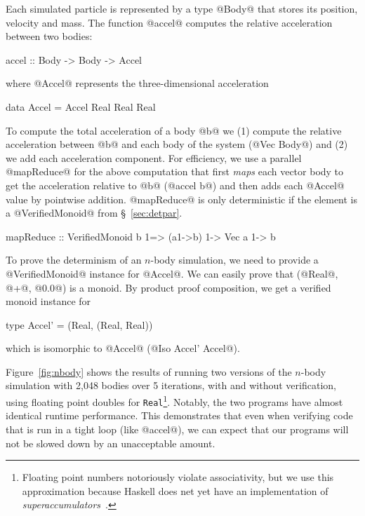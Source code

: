Each simulated particle is represented by a
type @Body@ that stores its position, velocity and mass.
%
The function @accel@ computes the relative acceleration
between two bodies:
\begin{mcode}
  accel :: Body -> Body -> Accel
\end{mcode}
where @Accel@ represents the three-dimensional acceleration
\begin{mcode}
  data Accel = Accel Real Real Real
\end{mcode}
%
To compute the total acceleration
of a body @b@ we
(1) compute the relative acceleration between @b@
and each body of the system (@Vec Body@) and
(2) we add each acceleration component.
%
For efficiency, we use a parallel @mapReduce@ for the above
computation that
first \textit{maps} each vector body to get the acceleration relative to @b@
(@accel b@) and then adds each @Accel@ value by pointwise addition.
%
@mapReduce@ is only deterministic if the element is a @VerifiedMonoid@
from \S~\ref{sec:detpar}.
\begin{mcode}
mapReduce :: VerifiedMonoid b 1=> (a1->b) 1-> Vec a 1-> b
\end{mcode}
%
To prove the determinism of an $n$-body simulation, we need to provide a
@VerifiedMonoid@ instance for @Accel@.
%
We can easily prove that (@Real@, @+@, @0.0@)
is a monoid.
%
By product proof composition, we get a verified monoid instance for
\begin{mcode}
  type Accel' = (Real, (Real, Real))
\end{mcode}
which is isomorphic to @Accel@ (\ie @Iso Accel' Accel@).

Figure~\ref{fig:nbody} shows the results of running two versions of the $n$-body
simulation with 2,048 bodies over 5 iterations, with and without verification,
using floating point doubles for \texttt{Real}\footnote{Floating point numbers
  notoriously violate associativity, but we use this approximation because
  Haskell does net yet have an implementation of {\em
    superaccumulators}~\cite{superaccumulation}.}. Notably, the two programs have almost
identical runtime performance.  This demonstrates that even when verifying code
that is run in a tight loop (like @accel@), we can expect that our programs
will not be slowed down by an unacceptable amount.

